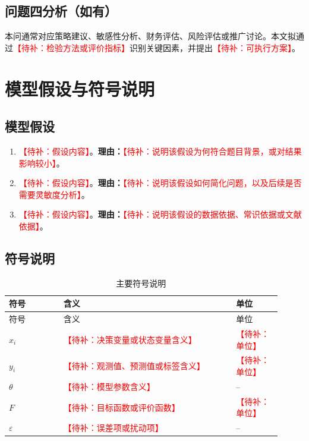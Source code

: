 \documentclass[UTF8,a4paper,zihao=5]{ctexart}
\numberwithin{equation}{section}
\numberwithin{figure}{section}
\numberwithin{table}{section}
\newcommand{\todo}[1]{\textcolor{red}{【待补：#1】}}
\begin{document}
\subsection{问题四分析（如有）}
本问通常对应策略建议、敏感性分析、财务评估、风险评估或推广讨论。本文拟通过\todo{检验方法或评价指标}识别关键因素，并提出\todo{可执行方案}。

\section{模型假设与符号说明}

\subsection{模型假设}
\begin{enumerate}[label={\textbf{假设\arabic*：}}]
  \item \todo{假设内容}。\textbf{理由：}\todo{说明该假设为何符合题目背景，或对结果影响较小}。
  \item \todo{假设内容}。\textbf{理由：}\todo{说明该假设如何简化问题，以及后续是否需要灵敏度分析}。
  \item \todo{假设内容}。\textbf{理由：}\todo{说明该假设的数据依据、常识依据或文献依据}。
\end{enumerate}

\subsection{符号说明}
\begin{longtable}{>{\centering\arraybackslash}p{0.18\linewidth}p{0.58\linewidth}>{\centering\arraybackslash}p{0.15\linewidth}}
\caption{主要符号说明}\\
\toprule
符号 & 含义 & 单位 \\
\midrule
\endfirsthead
\toprule
符号 & 含义 & 单位 \\
\midrule
\endhead
$x_i$ & \todo{决策变量或状态变量含义} & \todo{单位} \\
$y_i$ & \todo{观测值、预测值或标签含义} & \todo{单位} \\
$\theta$ & \todo{模型参数含义} & -- \\
$F$ & \todo{目标函数或评价函数} & \todo{单位} \\
$\varepsilon$ & \todo{误差项或扰动项} & -- \\
\bottomrule
\end{longtable}
\end{document}
